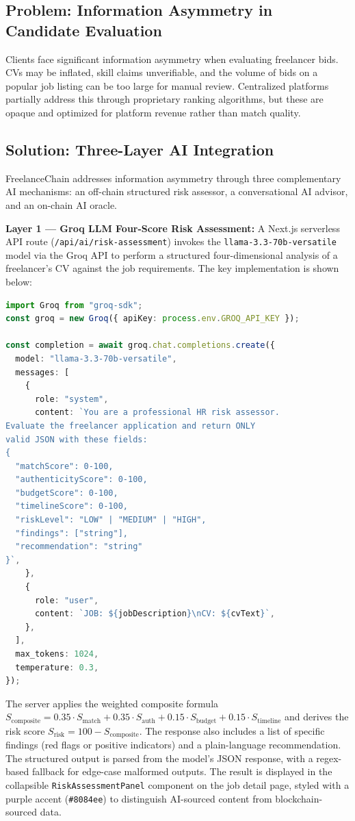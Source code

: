 \subsection{Problem: Information Asymmetry in Candidate Evaluation}

Clients face significant information asymmetry when evaluating freelancer bids. CVs may be inflated, skill claims unverifiable, and the volume of bids on a popular job listing can be too large for manual review. Centralized platforms partially address this through proprietary ranking algorithms, but these are opaque and optimized for platform revenue rather than match quality.

\subsection{Solution: Three-Layer AI Integration}

FreelanceChain addresses information asymmetry through three complementary AI mechanisms: an off-chain structured risk assessor, a conversational AI advisor, and an on-chain AI oracle.

\textbf{Layer 1 --- Groq LLM Four-Score Risk Assessment:} A Next.js serverless API route (\texttt{/api/ai/risk-assessment}) invokes the \texttt{llama-3.3-70b-versatile} model via the Groq API to perform a structured four-dimensional analysis of a freelancer's CV against the job requirements. The key implementation is shown below:

\begin{lstlisting}[language=TypeScript, caption={Groq LLM risk assessment API route (risk-assessment.ts)}, label={lst:groq_api}]
import Groq from "groq-sdk";
const groq = new Groq({ apiKey: process.env.GROQ_API_KEY });

const completion = await groq.chat.completions.create({
  model: "llama-3.3-70b-versatile",
  messages: [
    {
      role: "system",
      content: `You are a professional HR risk assessor.
Evaluate the freelancer application and return ONLY
valid JSON with these fields:
{
  "matchScore": 0-100,
  "authenticityScore": 0-100,
  "budgetScore": 0-100,
  "timelineScore": 0-100,
  "riskLevel": "LOW" | "MEDIUM" | "HIGH",
  "findings": ["string"],
  "recommendation": "string"
}`,
    },
    {
      role: "user",
      content: `JOB: ${jobDescription}\nCV: ${cvText}`,
    },
  ],
  max_tokens: 1024,
  temperature: 0.3,
});
\end{lstlisting}

The server applies the weighted composite formula $S_{\text{composite}} = 0.35 \cdot S_{\text{match}} + 0.35 \cdot S_{\text{auth}} + 0.15 \cdot S_{\text{budget}} + 0.15 \cdot S_{\text{timeline}}$ and derives the risk score $S_{\text{risk}} = 100 - S_{\text{composite}}$. The response also includes a list of specific findings (red flags or positive indicators) and a plain-language recommendation. The structured output is parsed from the model's JSON response, with a regex-based fallback for edge-case malformed outputs. The result is displayed in the collapsible \texttt{RiskAssessmentPanel} component on the job detail page, styled with a purple accent (\texttt{\#8084ee}) to distinguish AI-sourced content from blockchain-sourced data.

